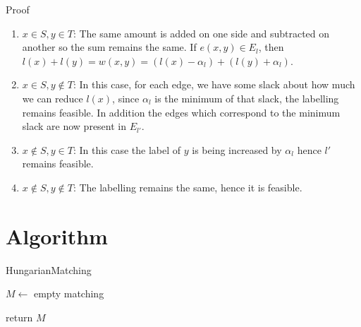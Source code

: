 \documentclass{article}
\begin{document}
Proof
\begin{enumerate}
    \item $x \in S, y \in T$: The same amount is added on one side and subtracted on another so the sum remains the same. If $e(x, y) \in E_l$, then $l(x)+l(y) = w(x, y) = (l(x)-\alpha_l)+(l(y)+\alpha_l)$.
    \item $x \in S, y \notin T$: In this case, for each edge, we have some slack about how much we can reduce $l(x)$, since $\alpha_l$ is the minimum of that slack, the labelling remains feasible. In addition the edge\/s which correspond to the minimum slack are now present in $E_{l'}$.
    \item $x \notin S, y \in T$: In this case the label of $y$ is being increased by $\alpha_l$ hence $l'$ remains feasible.
    \item $x \notin S, y \notin T$: The labelling remains the same, hence it is feasible.
\end{enumerate}

\section{Algorithm}

\begin{algorithm}[!h]
\caption{HungarianMatching}

$M \leftarrow$ empty matching



return $M$
\end{algorithm}
\end{document}
